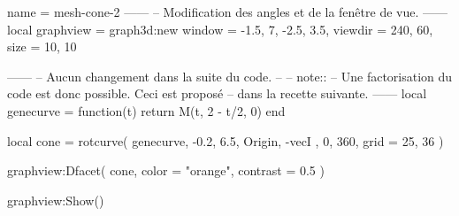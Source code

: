 \documentclass[varwidth]{standalone}
\begin{document}
\begin{luadraw}{name = mesh-cone-2}
------
-- Modification des angles et de la fenêtre de vue.
------
local graphview = graph3d:new{
  window  = {-1.5, 7, -2.5, 3.5},
  viewdir = {240, 60},
  size    = {10, 10}
}

------
-- Aucun changement dans la suite du code.
--
-- note::
--     Une factorisation du code est donc possible. Ceci est proposé
--     dans la recette suivante.
------
local genecurve = function(t)
  return M(t, 2 - t/2, 0)
end

local cone = rotcurve(
  genecurve,
  -0.2, 6.5,
  {
    Origin, -vecI
  },
  0, 360,
  {
    grid = {25, 36}
  }
)

graphview:Dfacet(
  cone,
  {
    color  = "orange",
    contrast = 0.5
  }
)

graphview:Show()
\end{luadraw}
\end{document}
